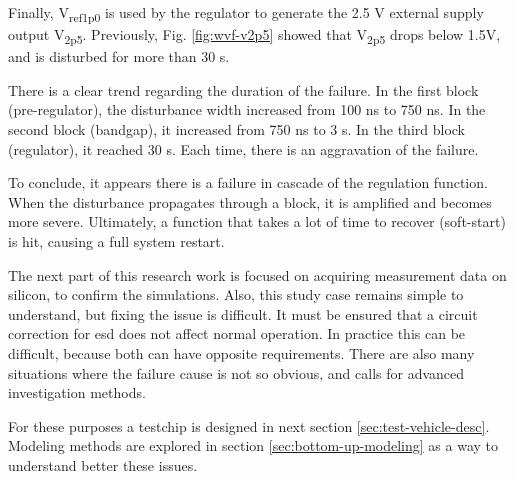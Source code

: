 Finally, V\textsubscript{ref1p0} is used by the regulator to generate the 2.5 V external supply output V\textsubscript{2p5}.
Previously,  Fig. \ref{fig:wvf-v2p5} showed that V\textsubscript{2p5} drops below 1.5V, and is disturbed for more than 30 \textmugreek{}s.

There is a clear trend regarding the duration of the failure.
In the first block (pre-regulator), the disturbance width increased from 100 ns to 750 ns.
In the second block (bandgap), it increased from 750 ns to 3 \textmugreek{}s.
In the third block (regulator), it reached 30 \textmugreek{}s.
Each time, there is an aggravation of the failure.

To conclude, it appears there is a failure in cascade of the regulation function.
When the disturbance propagates through a block, it is amplified and becomes more severe.
Ultimately, a function that takes a lot of time to recover (soft-start) is hit, causing a full system restart.

The next part of this research work is focused on acquiring measurement data on silicon, to confirm the simulations.
Also, this study case remains simple to understand, but fixing the issue is difficult.
It must be ensured that a circuit correction for \gls{esd} does not affect normal operation.
In practice this can be difficult, because both can have opposite requirements.
There are also many situations where the failure cause is not so obvious, and calls for advanced investigation methods.

For these purposes a testchip is designed in next section \ref{sec:test-vehicle-desc}.
Modeling methods are explored in section \ref{sec:bottom-up-modeling} as a way to understand better these issues.
